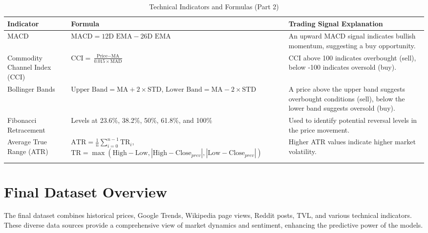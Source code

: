 \begin{longtable}{@{}p{3.5cm}p{6cm}X@{}}
\toprule
\textbf{Indicator} & \textbf{Formula} & \textbf{Trading Signal Explanation} \\ \midrule
\endhead

MACD & $\text{MACD} = \text{12D EMA} - \text{26D EMA}$ & An upward MACD signal indicates bullish momentum, suggesting a buy opportunity. \\ \midrule
Commodity Channel Index (CCI) & $\text{CCI} = \frac{\text{Price} - \text{MA}}{0.015 \times \text{MAD}}$ & CCI above 100 indicates overbought (sell), below -100 indicates oversold (buy). \\ \midrule
Bollinger Bands & $\text{Upper Band} = \text{MA} + 2 \times \text{STD}$, $\text{Lower Band} = \text{MA} - 2 \times \text{STD}$ & A price above the upper band suggests overbought conditions (sell), below the lower band suggests oversold (buy). \\ \midrule
Fibonacci Retracement & Levels at 23.6\%, 38.2\%, 50\%, 61.8\%, and 100\% & Used to identify potential reversal levels in the price movement. \\ \midrule
Average True Range (ATR) & $\text{ATR} = \frac{1}{n} \sum_{i=0}^{n-1} \text{TR}_{i}$, $\text{TR} = \max(\text{High} - \text{Low}, |\text{High} - \text{Close}_{prev}|, |\text{Low} - \text{Close}_{prev}|)$ & Higher ATR values indicate higher market volatility. \\ 
\bottomrule
\caption{Technical Indicators and Formulas (Part 2)}
\end{longtable}
\normalsize

\section{Final Dataset Overview}
The final dataset combines historical prices, Google Trends, Wikipedia page views, Reddit posts, TVL, and various technical indicators. These diverse data sources provide a comprehensive view of market dynamics and sentiment, enhancing the predictive power of the models.


